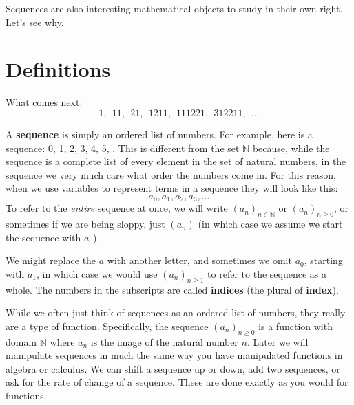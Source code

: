 \documentclass[11pt,]{book}
\newcommand{\terminology}[1]{\textbf{#1}}
\theoremstyle{ptxplainnotitle}
\theoremstyle{ptxplaintitle}
\theoremstyle{ptxdefinitionnotitle}
\theoremstyle{ptxdefinitiontitle}
\theoremstyle{ptxdefinitionnotitle}
\theoremstyle{ptxdefinitiontitle}
\theoremstyle{ptxdefinitionnotitle}
\theoremstyle{ptxdefinitiontitle}
\theoremstyle{ptxdefinitiontitlenonumber}
\theoremstyle{ptxdefinitiontitlenonumber}
\numberwithin{equation}{chapter}
\newcommand{\N}{\mathbb N}
\begin{document}
\par
\hypertarget{p-21}{}%
Sequences are also interesting mathematical objects to study in their own right. Let's see why.%
\typeout{************************************************}
\typeout{************************************************}
\section[{Definitions}]{Definitions}\label{sec_seq_intro}
\begin{investigation}\label{investigation-2}
\hypertarget{p-22}{}%
What comes next:%
\begin{equation*}
1, ~~11, ~~21, ~~1211, ~~111221, ~~312211, ~~\ldots
\end{equation*}
%
\end{investigation}
\hypertarget{p-23}{}%
A \terminology{sequence} is simply an ordered list of numbers. For example, here is a sequence: 0, 1, 2, 3, 4, 5, \textellipsis{}. This is different from the set \(\N\) because, while the sequence is a complete list of every element in the set of natural numbers, in the sequence we very much care what order the numbers come in. For this reason, when we use variables to represent terms in a sequence they will look like this:%
\begin{equation*}
a_0, a_1, a_2, a_3, \ldots
\end{equation*}
To refer to the \emph{entire} sequence at once, we will write \((a_n)_{n\in\N}\) or \((a_n)_{n\ge 0}\), or sometimes if we are being sloppy, just \((a_n)\) (in which case we assume we start the sequence with \(a_0\)). \label{notation-1}
%
\par
\hypertarget{p-24}{}%
We might replace the \(a\) with another letter, and sometimes we omit \(a_0\), starting with \(a_1\), in which case we would use \((a_n)_{n \ge 1}\) to refer to the sequence as a whole. The numbers in the subscripts are called \terminology{indices} (the plural of \terminology{index}).%
\par
\hypertarget{p-25}{}%
While we often just think of sequences as an ordered list of numbers, they really are a type of function. Specifically, the sequence \((a_n)_{n\ge 0}\) is a function with domain \(\N\) where \(a_n\) is the image of the natural number \(n\). Later we will manipulate sequences in much the same way you have manipulated functions in algebra or calculus. We can shift a sequence up or down, add two sequences, or ask for the rate of change of a sequence. These are done exactly as you would for functions.%
\end{document}
